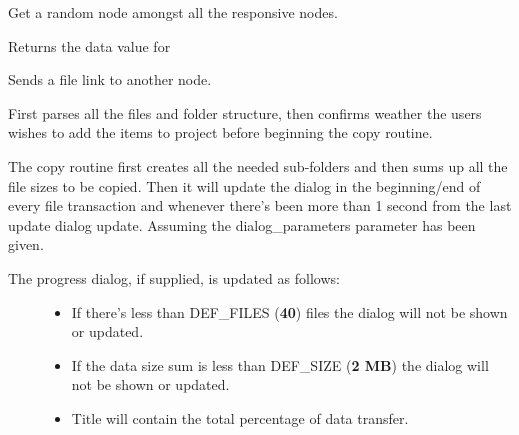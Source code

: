\documentclass[letterpaper,10pt,english]{sphinxmanual}
\begin{document}
\begin{fulllineitems}
\begin{fulllineitems}
\end{fulllineitems}


\begin{fulllineitems}
\label{state:state.State.get_random_responsive}
Get a random node amongst all the responsive nodes.

\end{fulllineitems}


\begin{fulllineitems}
\label{state:state.State.get_swnp_data}
Returns the data value for {\hyperref[swnp:swnp.Node]{}}

\end{fulllineitems}


\begin{fulllineitems}
\label{state:state.State.handle_file_send}
Sends a file link to another node.

First parses all the files and folder structure, then confirms weather
the users wishes to add the items to project before beginning the copy
routine.

The copy routine first creates all the needed sub-folders and then sums
up all the file sizes to be copied. Then it will update the dialog
in the beginning/end of every file transaction and whenever there's
been more than 1 second from the last update dialog update. Assuming
the dialog\_parameters parameter has been given.
\begin{description}
\item[{The progress dialog, if supplied, is updated as follows:}] \leavevmode\begin{itemize}
\item {} 
If there's less than DEF\_FILES (\textbf{40}) files the dialog             will not be shown or updated.

\item {} 
If the data size sum is less than DEF\_SIZE (\textbf{2 MB}) the             dialog will not be shown or updated.

\item {} 
Title will contain the total percentage of data transfer.


\end{itemize}
\end{description}
\end{fulllineitems}
\end{fulllineitems}
\end{document}
